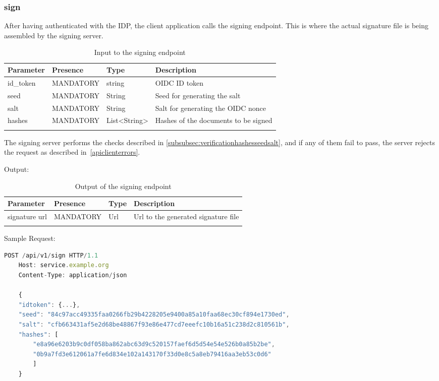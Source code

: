 \subsubsection{sign}\label{subsubsec:signrequest}
After having authenticated with the IDP, the client application calls the signing endpoint.
This is where the actual signature file is being assembled by the signing server.

\begin{longtable}{|l|l|l|l|}
    \hline
    \textbf{Parameter} & \textbf{Presence} & \textbf{Type} & \textbf{Description} \\ \hline
    id\_token & MANDATORY & string & OIDC ID token \\ \hline
    seed & MANDATORY & String & Seed for generating the salt \\ \hline
    salt & MANDATORY & String & Salt for generating the OIDC nonce \\ \hline
    hashes & MANDATORY & List<String> & Hashes of the documents to be signed \\ \hline
    \caption{Input to the signing endpoint}
\end{longtable}

The signing server performs the checks described in \ref{subsubsec:verificationhashesseedsalt},
and if any of them fail to pass,
the server rejects the request as described in~\ref{apiclienterrors}.

Output:

\begin{longtable}{|l|l|l|l|}
    \hline
    \textbf{Parameter} & \textbf{Presence} & \textbf{Type} & \textbf{Description} \\ \hline
    signature url & MANDATORY & Url & Url to the generated signature file\\ \hline
    \caption{Output of the signing endpoint}
\end{longtable}

Sample Request:
\begin{lstlisting}[caption={sign request}, captionpos=b, language=JavaScript, label={lst:signrequest}]
    POST /api/v1/sign HTTP/1.1
    Host: service.example.org
    Content-Type: application/json

    {
    "idtoken": {...},
    "seed": "84c97acc49335faa0266fb29b4228205e9400a85a10faa68ec30cf894e1730ed",
    "salt": "cfb663431af5e2d68be48867f93e86e477cd7eeefc10b16a51c238d2c810561b",
    "hashes": [
        "e8a96e6203b9c0df058ba862abc63d9c520157faef6d5d54e54e526b0a85b2be",
        "0b9a7fd3e612061a7fe6d834e102a143170f33d0e8c5a8eb79416aa3eb53c0d6"
        ]
    }
\end{lstlisting}

